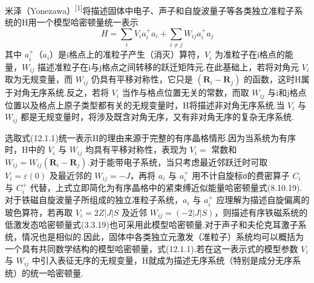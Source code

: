 米泽（Yonezawa）\textsuperscript{[1]}将描述固体中电子、声子和自旋波量子等各类独立准粒子系统的H用一个模型哈密顿量统一表示
\begin{equation}
  H=\sum_{i}V_{i}a_{i}^{+}a_{i}+\sum_{i\neq j}W_{ij}a_{i}^{+}a_{j}
\end{equation}
其中 $a_{i}^{+}$（$a_{i}$）是i格点上的准粒子产生（消灭）算符，$V_{i}$ 为准粒子在i格点的能量，$W_{ij}$ 描述准粒子在i与j格点之间转移的跃迁矩阵元.在此基础上，若将对角元 $V_{i}$ 取为无规变量，而 $W_{ij}$ 仍具有平移对称性，它只是 $(\boldsymbol{R}_{i}-\boldsymbol{R}_{j})$ 的函数，这时H属于对角无序系统.反之，若将 $V_{i}$ 当作与格点位置无关的常数，而取 $W_{ij}$ 与i和j格点位置以及格点上原子类型都有关的无规变量时，H将描述非对角无序系统.当 $V_{i}$ 与 $W_{ij}$ 都是无规变量时，将涉及既含对角无序，又有非对角无序的复杂无序系统.

选取式(12.1.1)统一表示H的理由来源于完整的有序晶格情形.因为当系统为有序时，H中的 $V_{i}$ 与 $W_{ij}$ 均具有平移对称性，表现为 $V_{i}=$ 常数和 $W_{ij}=W_{ij}\left(\boldsymbol{R}_{i}-\boldsymbol{R}_{j}\right)$.对于能带电子系统，当只考虑最近邻跃迁时可取 $V_{i}=\varepsilon\left(0\right)$ 及最近邻的 $W_{ij}=-J$，再将 $a_{i}$ 与 $a_{i}^{+}$ 用不计自旋标σ的费密算子 $C_{i}$ 与 $C_{i}^{+}$ 代替，上式立即简化为有序晶格中的紧束缚近似能量哈密顿量式(8.10.19).对于铁磁自旋波量子所组成的独立准粒子系统，$a_{i}$ 与 $a_{i}^{+}$ 应理解为描述自旋偏离的玻色算符，若再取 $V_{i}=2Z|J|S$ 及近邻 $W_{ij}=\left(-2|J|S\right)$，则描述有序铁磁系统的低激发态哈密顿量式(3.3.19)也可采用此模型哈密顿量.对于声子和夫伦克耳激子系统，情况也是相似的.因此，固体中各类独立元激发（准粒子）系统均可以概括为一个具有共同数学结构的模型哈密顿量，式(12.1.1).若在这一表示式的模型参数 $V_{i}$ 与 $W_{ij}$ 中引入表征无序的无规变量，H就成为描述无序系统（特别是成分无序系统）的统一哈密顿量.

